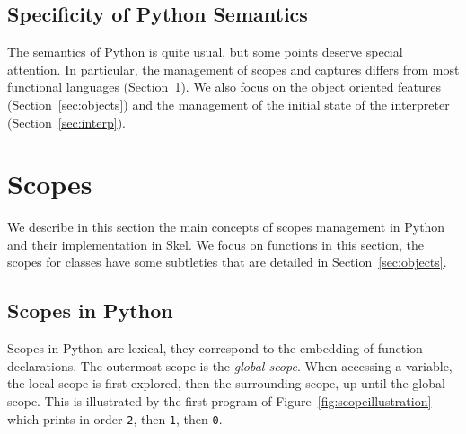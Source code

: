 \documentclass[submission,copyright,creativecommons]{eptcs}
\begin{document}
\subsection{Specificity of Python Semantics}
The semantics of Python is quite usual, but some points deserve special attention.
In particular, the management of scopes and captures differs from most
functional languages (Section~\ref{sec:scopes}).
We also focus on the object oriented features (Section~\ref{sec:objects}) and
the management of the initial state of the interpreter (Section~\ref{sec:interp}).

\section{Scopes}\label{sec:scopes}
We describe in this section the main concepts of scopes management in Python and their implementation in Skel.
We focus on functions in this section, the scopes for classes have some subtleties
that are detailed in Section~\ref{sec:objects}.

\subsection{Scopes in Python}
Scopes in Python are lexical, they correspond to the embedding of function
declarations. The outermost scope is the \emph{global scope}. When accessing a
variable, the local scope is first explored, then the surrounding scope, up
until the global scope. This is illustrated by the first program of
Figure~\ref{fig:scopeillustration} which prints in order \texttt{2}, then
\texttt{1}, then \texttt{0}.
\end{document}

